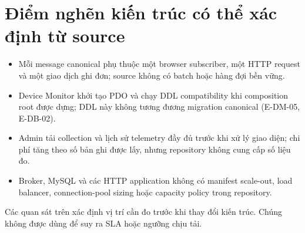 \section{Điểm nghẽn kiến trúc có thể xác định từ source}

\begin{itemize}
  \item Mỗi message canonical phụ thuộc một browser subscriber, một HTTP request và
  một giao dịch ghi đơn; source không có batch hoặc hàng đợi bền vững.
  \item Device Monitor khởi tạo PDO và chạy DDL compatibility khi composition root
  được dựng; DDL này không tương đương migration canonical (E-DM-05, E-DB-02).
  \item Admin tải collection và lịch sử telemetry đầy đủ trước khi xử lý giao diện;
  chi phí tăng theo số bản ghi được lấy, nhưng repository không cung cấp số liệu đo.
  \item Broker, MySQL và các HTTP application không có manifest scale-out, load
  balancer, connection-pool sizing hoặc capacity policy trong repository.
\end{itemize}

Các quan sát trên xác định vị trí cần đo trước khi thay đổi kiến trúc. Chúng không được
dùng để suy ra SLA hoặc ngưỡng chịu tải.
